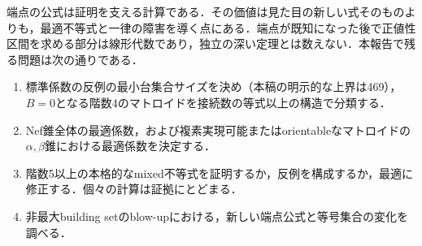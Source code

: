 \documentclass[12pt]{amsart}
\theoremstyle{definition}
\theoremstyle{remark}
\numberwithin{equation}{section}
\begin{document}
端点の公式は証明を支える計算である．その価値は見た目の新しい式そのものよりも，最適不等式と一律の障害を導く点にある．端点が既知になった後で正値性区間を求める部分は線形代数であり，独立の深い定理とは数えない．本報告で残る問題は次の通りである．
\begin{enumerate}
\item 標準係数の反例の最小台集合サイズを決め（本稿の明示的な上界は469），$B=0$となる階数4のマトロイドを接続数の等式以上の構造で分類する．
\item Nef錐全体の最適係数，および複素実現可能またはorientableなマトロイドの$\alpha,\beta$錐における最適係数を決定する．
\item 階数5以上の本格的なmixed不等式を証明するか，反例を構成するか，最適に修正する．個々の計算は証拠にとどまる．
\item 非最大building setのblow-upにおける，新しい端点公式と等号集合の変化を調べる．
\end{enumerate}
\newpage

\end{document}
